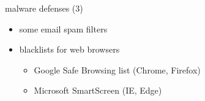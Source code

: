 \begin{frame}[plain]
\end{frame}


\begin{frame}{malware defenses (3)}
    \begin{itemize}
        \item some email spam filters
        \item blacklists for web browsers
            \begin{itemize}
            \item Google Safe Browsing list (Chrome, Firefox)
            \item Microsoft SmartScreen (IE, Edge)
            \end{itemize}
    \end{itemize}
\end{frame}

